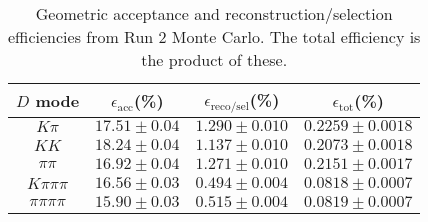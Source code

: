 \begin{table}[H]
    \centering
    \begin{tabular}{cccc}
        \toprule
        $D$ mode & $\epsilon_\mathrm{acc}$(\%) &  $\epsilon_\mathrm{reco/sel}$(\%) &  $\epsilon_\mathrm{tot}$(\%) \\
        \midrule
        $K\pi$ & $17.51 \pm 0.04$ & $1.290 \pm 0.010$ & $0.2259 \pm 0.0018$ \\
        $KK$ & $18.24 \pm 0.04$ & $1.137 \pm 0.010$ & $0.2073 \pm 0.0018$ \\
        $\pi\pi$ & $16.92 \pm 0.04$ & $1.271 \pm 0.010$ & $0.2151 \pm 0.0017$ \\
        $K\pi\pi\pi$ & $16.56 \pm 0.03$ & $0.494 \pm 0.004$ & $0.0818 \pm 0.0007$ \\
        $\pi\pi\pi\pi$ & $15.90 \pm 0.03$ & $0.515 \pm 0.004$ & $0.0819 \pm 0.0007$ \\
        \bottomrule
    \end{tabular}
    \caption{Geometric acceptance and reconstruction/selection efficiencies from  Run 2 Monte Carlo. The total efficiency is the  product of these.}
\label{tab:selection_efficiency_run2}
\end{table}
